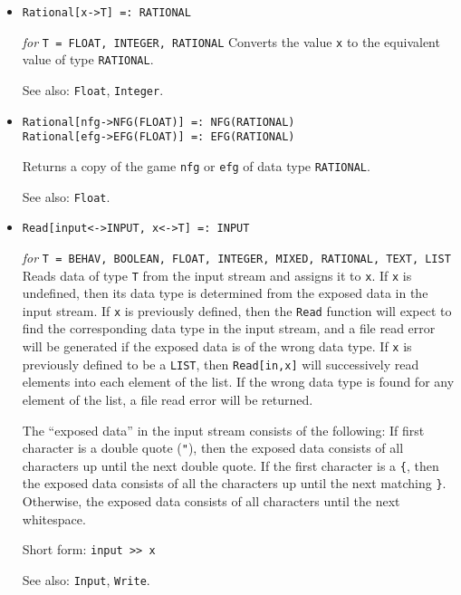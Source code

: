 \begin{itemize}
\item{}
\protect \large \begin{verbatim}
Rational[x->T] =: RATIONAL
\end{verbatim} \normalsize

{\it for} {\tt T = FLOAT, INTEGER, RATIONAL}
\bd
Converts the value \verb+x+ to the equivalent value of
type {\tt RATIONAL}.
\item [See also:] \verb+Float+, \verb+Integer+.
\ed

\item{}
\protect \large \begin{verbatim}
Rational[nfg->NFG(FLOAT)] =: NFG(RATIONAL)
Rational[efg->EFG(FLOAT)] =: EFG(RATIONAL)
\end{verbatim} \normalsize

\bd
Returns a copy of the game \verb+nfg+ or \verb+efg+ of data type 
{\tt RATIONAL}. 
\item [See also:] \verb+Float+.
\ed

\item{}
\protect \large \begin{verbatim}
Read[input<->INPUT, x<->T] =: INPUT 
\end{verbatim}\normalsize

{\it for} {\tt T = BEHAV, BOOLEAN, FLOAT, INTEGER, MIXED, RATIONAL,
TEXT, LIST}
\bd
Reads data of type \verb+T+ from the input stream and assigns it to
\verb+x+.  If \verb+x+ is undefined, then its data type is determined
from the exposed data in the input stream.  If \verb+x+ is previously
defined, then the \verb+Read+ function will expect to find the
corresponding data type in the input stream, and a file read error
will be generated if the exposed data is of the wrong data type.  If
\verb+x+ is previously defined to be a \verb+LIST+, then \verb+Read[in,x]+
will successively read elements into each element of the list.  If the
wrong data type is found for any element of the list, a file read
error will be returned.

The ``exposed data'' in the input stream consists of the following: If
first character is a double quote (\verb+"+), then the exposed data
consists of all characters up until the next double quote.  If the
first character is a \verb+{+, then the exposed data consists of all
the characters up until the next matching \verb+}+.  Otherwise, the
exposed data consists of all characters until the next whitespace.
\item [Short form:] \verb+input >> x+
\item [See also:] \verb+Input+, \verb+Write+.
\ed


\end{itemize}
